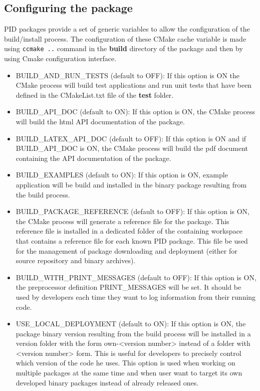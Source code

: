 \documentclass[12pt,a4paper]{article}
\begin{document}
\subsection{Configuring the package}
\label{sec:configCMake}

PID packages provide a set of generic variables to allow the configuration of the build/install process. The configuration of these CMake cache variable is made using \texttt{ccmake ..} command in the \textbf{build} directory of the package and then by using Cmake configuration interface.
\begin{itemize}
\item BUILD\_AND\_RUN\_TESTS (default to OFF): If this option is ON the CMake process will build test applications and run unit tests that have been defined in the CMakeList.txt file of the \textbf{test} folder.
\item BUILD\_API\_DOC (default to ON): If this option is ON, the CMake process will build the html API documentation of the package.
\item BUILD\_LATEX\_API\_DOC (default to OFF): If this option is ON and if BUILD\_API\_DOC is ON, the CMake process will build the pdf document containing the API documentation of the package.
\item BUILD\_EXAMPLES (default to ON): If this option is ON, example application will be build and installed in the binary package resulting from the build process.
\item BUILD\_PACKAGE\_REFERENCE (default to OFF): If this option is ON, the CMake process will generate a reference file for the package. This reference file is installed in a dedicated folder of the containing workspace that contains a reference file for each known PID package. This file be used for the management of package downloading and deployment (either for source repository and binary archives).
\item BUILD\_WITH\_PRINT\_MESSAGES (default to OFF): If this option is ON, the preprocessor definition PRINT\_MESSAGES will be set. It should be used by developers each time they want to log information from their running code.
\item USE\_LOCAL\_DEPLOYMENT (default to ON): If this option is ON, the package binary version resulting from the build process will be installed in a version folder with the form own-<version number> instead of a folder with <version number> form. This is useful for developers to precisely control which version of the code he uses. This option is used when working on multiple packages at the same time and when user want to target its own developed binary packages instead of already released ones.

\end{itemize}
\end{document}
